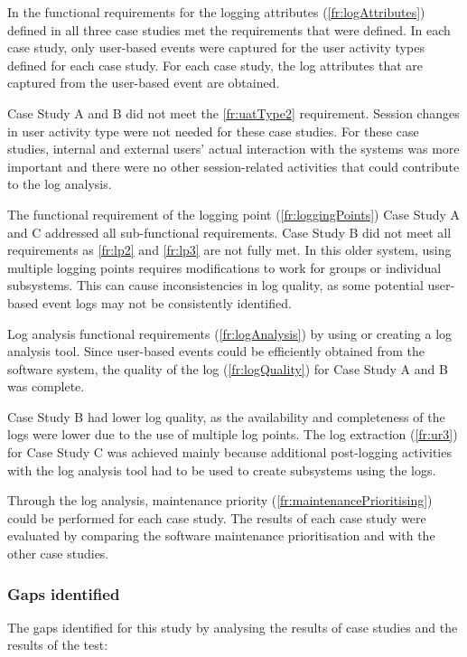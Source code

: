 In  the functional requirements for the logging attributes (\ref{fr:logAttributes}) defined in  all three case studies met the requirements that were defined. In each case study, only user-based events were captured for the user activity types defined for each case study. For each case study, the log attributes that are captured from the user-based event are obtained.\par Case Study A and B did not meet the \ref{fr:uatType2} requirement. Session changes in user activity type were not needed for these case studies. For these case studies, internal and external users' actual interaction with the systems was more important and there were no other session-related activities that could contribute to the log analysis. \par The functional requirement of the logging point (\ref{fr:loggingPoints}) Case Study A and C addressed all sub-functional requirements. Case Study B did not meet all requirements as \ref{fr:lp2} and \ref{fr:lp3} are not fully met. In this older system, using multiple logging points requires modifications to work for groups or individual subsystems. This can cause inconsistencies in log quality, as some potential user-based event logs may not be consistently identified.\par Log analysis functional requirements (\ref{fr:logAnalysis}) by using or creating a log analysis tool. Since user-based events could be efficiently obtained from the software system, the quality of the log (\ref{fr:logQuality}) for Case Study A and B was complete. \par Case Study B had lower log quality, as the availability and completeness of the logs were lower due to the use of multiple log points. The log extraction (\ref{fr:ur3}) for Case Study C was achieved mainly because additional post-logging activities with the log analysis tool had to be used to create subsystems using the logs.\par Through the log analysis, maintenance priority (\ref{fr:maintenancePrioritising}) could be performed for each case study. The results of each case study were evaluated by comparing the software maintenance prioritisation and with the other case studies.

\subsubsection{Gaps identified}
The gaps identified for this study by analysing the results of case studies and the results of the test:

